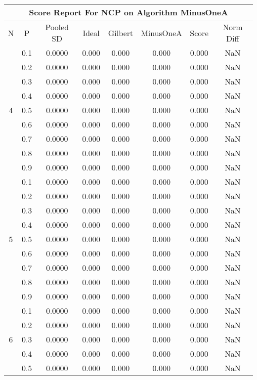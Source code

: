 \documentclass[11pt,a4paper]{report}
\begin{document}
\begin{longtable}{ | c | c || c | c | c | c | c | c | }
\hline
\multicolumn{8}{|c|}{ Score Report For NCP on Algorithm MinusOneA} \\
\hline
N & P & Pooled SD &  Ideal &  Gilbert & MinusOneA  & Score & Norm Diff \\
 \hline
 \hline
 \endhead
\multirow{9}{*}{4} & 0.1 & 0.0000 & 0.000 & 0.000 & 0.000 & 0.000 & NaN \\
 & 0.2 & 0.0000 & 0.000 & 0.000 & 0.000 & 0.000 & NaN \\
 & 0.3 & 0.0000 & 0.000 & 0.000 & 0.000 & 0.000 & NaN \\
 & 0.4 & 0.0000 & 0.000 & 0.000 & 0.000 & 0.000 & NaN \\
 & 0.5 & 0.0000 & 0.000 & 0.000 & 0.000 & 0.000 & NaN \\
 & 0.6 & 0.0000 & 0.000 & 0.000 & 0.000 & 0.000 & NaN \\
 & 0.7 & 0.0000 & 0.000 & 0.000 & 0.000 & 0.000 & NaN \\
 & 0.8 & 0.0000 & 0.000 & 0.000 & 0.000 & 0.000 & NaN \\
 & 0.9 & 0.0000 & 0.000 & 0.000 & 0.000 & 0.000 & NaN \\
 \hline
\multirow{9}{*}{5} & 0.1 & 0.0000 & 0.000 & 0.000 & 0.000 & 0.000 & NaN \\
 & 0.2 & 0.0000 & 0.000 & 0.000 & 0.000 & 0.000 & NaN \\
 & 0.3 & 0.0000 & 0.000 & 0.000 & 0.000 & 0.000 & NaN \\
 & 0.4 & 0.0000 & 0.000 & 0.000 & 0.000 & 0.000 & NaN \\
 & 0.5 & 0.0000 & 0.000 & 0.000 & 0.000 & 0.000 & NaN \\
 & 0.6 & 0.0000 & 0.000 & 0.000 & 0.000 & 0.000 & NaN \\
 & 0.7 & 0.0000 & 0.000 & 0.000 & 0.000 & 0.000 & NaN \\
 & 0.8 & 0.0000 & 0.000 & 0.000 & 0.000 & 0.000 & NaN \\
 & 0.9 & 0.0000 & 0.000 & 0.000 & 0.000 & 0.000 & NaN \\
 \hline
\multirow{9}{*}{6} & 0.1 & 0.0000 & 0.000 & 0.000 & 0.000 & 0.000 & NaN \\
 & 0.2 & 0.0000 & 0.000 & 0.000 & 0.000 & 0.000 & NaN \\
 & 0.3 & 0.0000 & 0.000 & 0.000 & 0.000 & 0.000 & NaN \\
 & 0.4 & 0.0000 & 0.000 & 0.000 & 0.000 & 0.000 & NaN \\
 & 0.5 & 0.0000 & 0.000 & 0.000 & 0.000 & 0.000 & NaN \\

\end{longtable}
\end{document}

